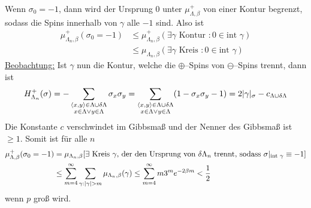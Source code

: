 \begin{beweis}
	Wenn $\sigma_0 = -1$, dann wird der Ursprung $0$ unter $\mu_{\Lambda, \beta}^{+}$ von einer Kontur begrenzt, sodass die Spins innerhalb von $\gamma$ alle $-1$ sind. Also ist 
	\begin{align}
		\mu_{\Lambda_n, \beta}^{+}(\sigma_0 = -1) &\leq \mu_{\Lambda_n, \beta}^{+} (\exists \gamma \text{ Kontur } : 0 \in \text{int } \gamma) \\
					&\leq \mu_{\Lambda_n, \beta}(\exists \gamma \text{ Kreis } : 0 \in \text{int } \gamma)
	\end{align}
	\underline{Beobachtung:} Ist $\gamma$ nun die Kontur, welche die $\oplus$--Spins von $\ominus$--Spins trennt, dann ist 
	\begin{align}
		H^+_{\Lambda_n} (\sigma) = - \sum\limits_{\substack{\langle x,y\rangle \in \Lambda \cup \delta \Lambda \\ x \in \Lambda \lor y \in \Lambda}} \sigma_x \sigma_y = \sum\limits_{{\substack{\langle x,y\rangle \in \Lambda \cup \delta \Lambda \\ x \in \Lambda \lor y \in \Lambda}}} (1- \sigma_x \sigma_y -1) = 2 \lvert\gamma\rvert_{\sigma} - c_{\Lambda \cup \delta \Lambda}
	\end{align}
	Die Konstante $c$ verschwindet im Gibbsmaß und der Nenner des Gibbsmaß ist $\geq 1$. Somit ist für alle $n$
	\begin{align}
		\mu_{\Lambda, \beta}^{+} (\sigma_0 = -1) &= \mu_{\Lambda_n, \beta} \benb{\exists \text{ Kreis $\gamma$, der den Ursprung von $\delta\Lambda_n$ trennt, sodass } \sigma|_{\text{int } \gamma } \equiv -1} \\
				&\leq \sum\limits_{m = 4}^{\infty} \sum\limits_{\gamma: \abs{\gamma} > m} \mu_{\Lambda_n,\beta} (\gamma) \leq \sum\limits_{m = 4}^{\infty} m3^m e^{-2\beta m} < \frac{1}{2}
	\end{align}
	wenn $p$ groß wird.
\end{beweis}

